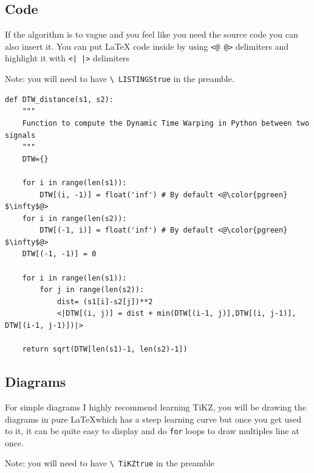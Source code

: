 \documentclass{project-logbook}
\begin{document}
{%

\subsection{Code} %
\label{sub:code}

\begin{tip}
If the algorithm is to vague and you feel like you need the source code you can also insert it. You can put LaTeX code inside by using \texttt{<@ @>} delimiters and highlight it with \texttt{<| |>} delimiters

Note: you will need to have \texttt{\textbackslash
LISTINGStrue} in the preamble.
\end{tip}

\begin{lstlisting}[style=Python]
def DTW_distance(s1, s2):
	"""
	Function to compute the Dynamic Time Warping in Python between two signals
	"""
	DTW={}

	for i in range(len(s1)):
		DTW[(i, -1)] = float('inf') # By default <@\color{pgreen} $\infty$@>
	for i in range(len(s2)):
		DTW[(-1, i)] = float('inf') # By default <@\color{pgreen} $\infty$@>
	DTW[(-1, -1)] = 0

	for i in range(len(s1)):
		for j in range(len(s2)):
			dist= (s1[i]-s2[j])**2
			<|DTW[(i, j)] = dist + min(DTW[(i-1, j)],DTW[(i, j-1)], DTW[(i-1, j-1)])|>

	return sqrt(DTW[len(s1)-1, len(s2)-1])
\end{lstlisting}

\clearpage
\subsection{Diagrams} %
\label{sub:diagrams}

\begin{tip}
For simple diagrams I highly recommend learning TiKZ, you will be drawing the diagrams in pure \LaTeX which has a steep learning curve but once you get used to it, it can be quite easy to display and do \texttt{for} loops to draw multiples line at once.

Note: you will need to have \texttt{\textbackslash
TiKZtrue} in the preamble
\end{tip}

\begin{figure}[!h]
\centering
{}


\end{figure}}
\end{document}
